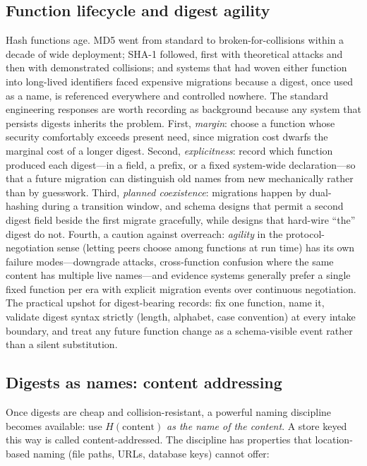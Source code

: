 \subsection{Function lifecycle and digest agility}\label{ch02:agility}

Hash functions age. MD5 went from standard to broken-for-collisions
within a decade of wide deployment; SHA-1 followed, first with
theoretical attacks and then with demonstrated collisions; and
systems that had woven either function into long-lived identifiers
faced expensive migrations because a digest, once used as a name, is
referenced everywhere and controlled nowhere. The standard
engineering responses are worth recording as background because any
system that persists digests inherits the problem. First,
\emph{margin}: choose a function whose security comfortably exceeds
present need, since migration cost dwarfs the marginal cost of a
longer digest. Second, \emph{explicitness}: record which function
produced each digest---in a field, a prefix, or a fixed system-wide
declaration---so that a future migration can distinguish old names
from new mechanically rather than by guesswork. Third,
\emph{planned coexistence}: migrations happen by dual-hashing
during a transition window, and schema designs that permit a second
digest field beside the first migrate gracefully, while designs that
hard-wire ``the'' digest do not. Fourth, a caution against
overreach: \emph{agility} in the protocol-negotiation sense (letting
peers choose among functions at run time) has its own failure
modes---downgrade attacks, cross-function confusion where the same
content has multiple live names---and evidence systems generally
prefer a single fixed function per era with explicit migration
events over continuous negotiation. The practical upshot for
digest-bearing records: fix one function, name it, validate digest
syntax strictly (length, alphabet, case convention) at every intake
boundary, and treat any future function change as a schema-visible
event rather than a silent substitution.

\subsection{Digests as names: content addressing}\label{ch02:contentaddr}

Once digests are cheap and collision-resistant, a powerful naming
discipline becomes available: use $H(\text{content})$ \emph{as the
name of the content}. A store keyed this way is called
content-addressed. The discipline has properties that location-based
naming (file paths, URLs, database keys) cannot offer:

